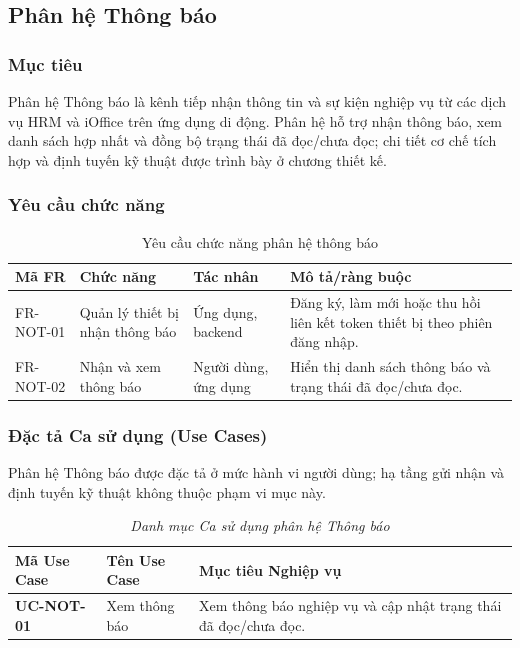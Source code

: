 \subsection{Phân hệ Thông báo}
\label{subsec:req_notification}
\label{subsec:module_notification}

\subsubsection{Mục tiêu}
Phân hệ Thông báo là kênh tiếp nhận thông tin và sự kiện nghiệp vụ từ các dịch vụ HRM và iOffice trên ứng dụng di động. Phân hệ hỗ trợ nhận thông báo, xem danh sách hợp nhất và đồng bộ trạng thái đã đọc/chưa đọc; chi tiết cơ chế tích hợp và định tuyến kỹ thuật được trình bày ở chương thiết kế.

\subsubsection{Yêu cầu chức năng}

\begin{table}[H]
\centering
\small
\caption{Yêu cầu chức năng phân hệ thông báo}
\label{tab:fr_notification}
\begin{tabularx}{\textwidth}{|L{1.7cm}|L{3.0cm}|L{2.4cm}|Y|}
\hline
\textbf{Mã FR} & \textbf{Chức năng} & \textbf{Tác nhân} & \textbf{Mô tả/ràng buộc} \\
\hline
FR-NOT-01 & Quản lý thiết bị nhận thông báo & Ứng dụng, backend & Đăng ký, làm mới hoặc thu hồi liên kết token thiết bị theo phiên đăng nhập. \\
\hline
FR-NOT-02 & Nhận và xem thông báo & Người dùng, ứng dụng & Hiển thị danh sách thông báo và trạng thái đã đọc/chưa đọc. \\
\hline
\end{tabularx}
\end{table}

\subsubsection{Đặc tả Ca sử dụng (Use Cases)}

Phân hệ Thông báo được đặc tả ở mức hành vi người dùng; hạ tầng gửi nhận và định tuyến kỹ thuật không thuộc phạm vi mục này.

\begin{table}[H]
\centering
\caption[\textit{Danh mục Use Case phân hệ Thông báo}]{\textit{Danh mục Ca sử dụng phân hệ Thông báo}}
\label{tab:mapping_uc_notification}
\vspace{0.15cm}
\begin{tabularx}{\textwidth}{|>{\RaggedRight\arraybackslash\small}p{2.8cm}|>{\RaggedRight\arraybackslash\small}p{4.2cm}|Y|}
\hline
\textbf{Mã Use Case} & \textbf{Tên Use Case} & \textbf{Mục tiêu Nghiệp vụ} \\
\hline
\textbf{UC-NOT-01} & Xem thông báo & Xem thông báo nghiệp vụ và cập nhật trạng thái đã đọc/chưa đọc. \\
\hline
\end{tabularx}
\end{table}

